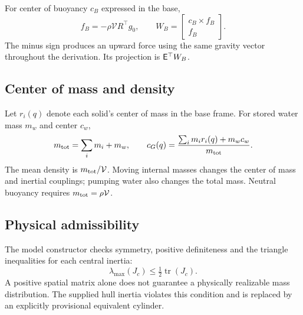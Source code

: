 \documentclass[11pt,a4paper]{article}
\begin{document}
For center of buoyancy \(c_B\) expressed in the base,
\begin{equation}
f_B=-\rho\mathcal V R^\top g_0,\qquad
W_B=\begin{bmatrix}c_B\times f_B\\f_B\end{bmatrix}.\label{eq:buoy}
\end{equation}
The minus sign produces an upward force using the same gravity vector
throughout the derivation. Its projection is \(\mathsf E^\top W_B\).

\subsection{Center of mass and density}
Let \(r_i(q)\) denote each solid's center of mass in the base frame.
For stored water mass \(m_w\) and center \(c_w\),
\begin{equation}
m_{\rm tot}=\sum_i m_i+m_w,\qquad
c_G(q)=\frac{\sum_i m_ir_i(q)+m_wc_w}{m_{\rm tot}}.
\end{equation}
The mean density is \(m_{\rm tot}/\mathcal V\). Moving internal masses
changes the center of mass and inertial couplings; pumping water also
changes the total mass. Neutral buoyancy requires
\(m_{\rm tot}=\rho\mathcal V\).

\subsection{Physical admissibility}
The model constructor checks symmetry, positive definiteness and the
triangle inequalities for each central inertia:
\begin{equation}
\lambda_{\max}(J_c)\leq\tfrac12\operatorname{tr}(J_c).
\end{equation}
A positive spatial matrix alone does not guarantee a physically
realizable mass distribution. The supplied hull inertia violates this
condition and is replaced by an explicitly provisional equivalent
cylinder.
\clearpage
\end{document}
